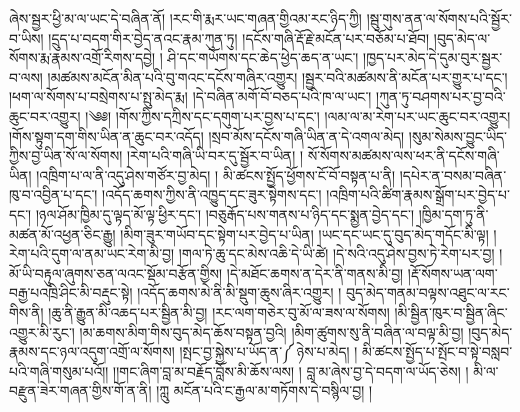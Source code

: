 ཞེས་སྦྱར་ཕྱི་མ་ལ་ཡང་དེ་བཞིན་ནོ། །རང་གི་རྨར་ཡང་གཞན་གྱིའམ་རང་ཉིད་ཀྱི། །སྦུ་གུས་ནན་ལ་སོགས་པའི་སྦྱོར་བ་ཡིས། །དྲུད་པ་བདག་གིར་བྱེད་ནའང་རྣམ་ཀུན་ཏུ། །དངོས་གཞི་རྡོ་རྗེ་མངོན་པར་བཅོམ་པ་ཐོབ། །བུད་མེད་ལ་སོགས་རྨ་རྣམས་འགྲོ་རིགས་དབྱེ། ། ཤི་དང་གཡོགས་དང་ཆེད་ཕྱེད་ཆད་ན་ཡང་། །ཁྱད་པར་མེད་དེ་དུམ་བུར་སྦྱར་བ་ལས། །མཚམས་མངོན་མིན་པའི་བུ་གའང་དངོས་གཞིར་འགྱུར། །སྦྱར་བའི་མཚམས་ནི་མངོན་པར་གྱུར་པ་དང་། །ཕག་ལ་སོགས་པ་བསྲེགས་པ་སྤུ་མེད་རྨ། །དེ་བཞིན་མགོ་བོ་བཅད་པའི་ཁ་ལ་ཡང་། །ཀུན་ཏུ་བཤགས་པར་བྱ་བའི་ཆུང་བར་འགྱུར། །༄༅། །གོས་ཀྱིས་དཀྲིས་དང་དགུག་པར་བྱས་པ་དང་། །ལམ་ལ་མ་རེག་པར་ཡང་ཆུང་བར་འགྱུར། །གོས་སྟུག་དག་གིས་ཡིན་ན་ཆུང་བར་འདོད། །སྲབ་མོས་དངོས་གཞི་ཡིན་ན་དེ་འགལ་མེད། །སུམ་སེམས་བྱུང་ཡིད་ཀྱིས་བྱ་ཡིན་སོ་ལ་སོགས། །རེག་པའི་གཞི་ཡི་བར་དུ་སྦྱོར་བ་ཡིན། ། སོ་སོགས་མཚམས་ལས་ཕར་ནི་དངོས་གཞི་ཡིན། །འཁྲིག་པ་ལ་ནི་འདུ་ཤེས་གཙོར་བྱ་མེད། ། མི་ཚངས་སྤྱོད་ཕྱོགས་ངོ་བོ་བསྟན་པ་ནི། །དཔེར་ན་བསམ་བཞིན་ཁུ་བ་འབྱིན་པ་དང་། །འདོད་ཆགས་ཀྱིས་ནི་འཁྱུད་དང་ཟུར་སྟེགས་དང་། །འཁྲིག་པའི་ཚིག་རྣམས་སྒྲོག་པར་བྱེད་པ་དང་། །ཉལ་ཤོམ་ཁྱིམ་དུ་ལྟད་མོ་ལྟ་ཕྱིར་དང་། །བཅུརྒོད་པས་གནས་པ་ཉིད་དང་སྨྱན་བྱེད་དང་། །ཁྱིམ་དག་ཏུ་ནི་མཚན་མོ་འཕྱན་ཅིང་རྒྱུ། །མིག་ཟུར་གཡོབ་དང་སྟེག་པར་བྱེད་པ་ཡིན། །ཡང་དང་ཡང་དུ་བུད་མེད་གདོང་མི་ལྟ། །རེག་པའི་དུག་ལ་ནམ་ཡང་རེག་མི་བྱ། །གལ་ཏེ་ཆུ་དང་མེས་འཆི་དེ་ཡི་ཚེ། །དེ་སའི་འདུ་ཤེས་བྱས་ཏེ་རེག་པར་བྱ། ། མོ་ཡི་བརྟུལ་ཞུགས་ཅན་ལའང་སྡོམ་བརྩོན་གྱིས། །དེ་མཐོང་ཆགས་ན་དེར་ནི་གནས་མི་བྱ། །རྡོ་སོགས་ཡན་ལག་བརྒྱ་པའཁྲི་ཤིང་མི་བརྡུང་སྟེ། །འདོད་ཆགས་མེ་ནི་མི་སྡུག་ཆུས་ཞིར་འགྱུར། ། བུད་མེད་གནམ་བལྟས་འཐུང་ལ་རང་གིས་ནི། །ཆུ་ནི་རྒྱུན་མི་འཆད་པར་སྦྱིན་མི་བྱ། །རང་ལག་གཅེར་བུ་མོ་ལ་ཟས་ལ་སོགས། །མི་སྦྱིན་ཁུར་བ་སྦྱིན་ཞིང་འགྱུར་མི་རུང་། །མ་ཆགས་མིག་གིས་བུད་མེད་ཆོས་བསྟན་བྱའི། །མིག་ཚུགས་སུ་ནི་བཞིན་ལ་བལྟ་མི་བྱ། །བུད་མེད་རྣམས་དང་ཉལ་འདུག་འགྲོ་ལ་སོགས། །སྤང་བྱ་སྐྱེས་པ་ཡོད་ན་༼ ཉེས་པ་མེད། ། མི་ཚངས་སྤྱོད་པ་སྤོང་བ་སྟེ་བསླབ་པའི་གཞི་གསུམ་པའོ།། །།གང་ཞིག་བླ་མ་བརྗོད་བློས་མི་ཆོས་ལས། ། བླ་མ་ཞེས་བྱ་དེ་བདག་ལ་ཡོད་ཅེས། ། མི་ལ་བརྫུན་ཟེར་གཞན་གྱིས་གོ་ན་ནི། །ཀླུ མངོན་པའི་ང་རྒྱལ་མ་གཏོགས་དེ་བསྙིལ་བྱ། །
